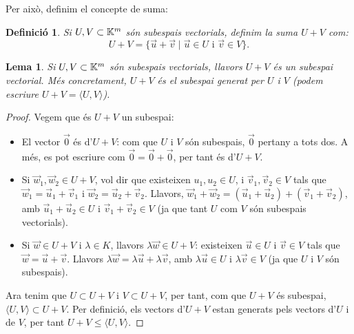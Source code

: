 \documentclass[
  11pt,
]{book}
\numberwithin{dummy}{section}
\theoremstyle{maincolornumbox}
\theoremstyle{blacknumex}
\theoremstyle{blacknumbox}
\newtheorem{definitionT}{Definició}[chapter]
\theoremstyle{maincolornum}
\newtheorem{lemmaT}{Lema}[chapter]
\newenvironment{lemma}{\begin{pBox}\begin{lemmaT}}{\end{lemmaT}\end{pBox}}
\newenvironment{definition}{\begin{dBox}\begin{definitionT}}{\end{definitionT}\end{dBox}}
\newlength\esp
\begin{document}
Per això, definim el concepte de suma:

\begin{definition}
Si \(U,V\subset \mathbb{K}^m\) són subespais vectorials, definim la suma \(U+V\)
com:
\[U+V=\{\vec u+\vec v \mid \vec u \in U \text{ i } \vec v \in V\} .\]
\end{definition}

\begin{lemma}
Si \(U,V\subset \mathbb{K}^m\) són subespais vectorials, llavors \(U+V\) és un
subespai vectorial. Més concretament, \(U+V\) és el subespai generat per
\(U\) i \(V\) (podem escriure \(U+V=\langle U,V\rangle\)).
\end{lemma}

\begin{proof}
Vegem que és \(U+V\) un subespai:

\begin{itemize}
\item
  El vector \(\vec 0\) és d'\(U+V\): com que \(U\) i \(V\) són subespais,
  \(\vec 0\) pertany a tots dos. A més, es pot escriure com
  \(\vec 0=\vec 0 +\vec 0\), per tant és d'\(U+V\).
\item
  Si \(\vec w_1,\vec w_2 \in U+V\), vol dir que existeixen
  \(u_1, u_2 \in U\), i \(\vec v_1, \vec v_2 \in V\) tals que
  \(\vec w_1=\vec u_1+\vec v_1\) i \(\vec w_2=\vec u_2+\vec v_2\).
  Llavors,
  \(\vec w_1+\vec w_2=(\vec u_1+\vec u_2)+(\vec v_1+\vec v_2)\), amb
  \(\vec u_1+\vec u_2 \in U\) i \(\vec v_1+\vec v_2\in V\) (ja que tant
  \(U\) com \(V\) són subespais vectorials).
\item
  Si \(\vec w \in U+V\) i \(\lambda \in K\), llavors
  \(\lambda \vec w \in U+V\): existeixen \(\vec u \in U\) i \(\vec v\in V\)
  tals que \(\vec w=\vec u +\vec v\). Llavors
  \(\lambda \vec w=\lambda \vec u+\lambda \vec v\), amb
  \(\lambda \vec u\in U\) i \(\lambda \vec v\in V\) (ja que \(U\) i \(V\) són
  subespais).
\end{itemize}

Ara tenim que \(U\subset U+V\) i \(V\subset U+V\), per tant, com que \(U+V\)
és subespai, \(\langle U,V\rangle\subset U+V\). Per definició, els vectors
d'\(U+V\) estan generats pels vectors d'\(U\) i de \(V\), per tant
\(U+V\leq \langle U,V \rangle\).
\end{proof}
\end{document}
